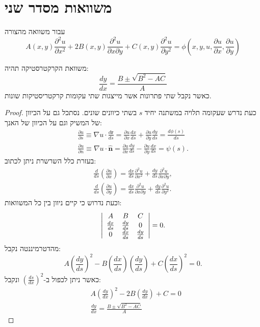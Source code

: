 \documentclass{tstextbook}
\begin{document}
\section{משוואות מסדר שני}

\begin{definition}
עבור משוואה מהצורה 
$$ A(x,y)\frac{\partial^2u}{\partial x^2}\!+\!2B(x,y)\frac{\partial^2u}{\partial x\partial y}\!+\!C(x,y)\frac{\partial^2u}{\partial y^2}\!=\!\phi\left(\!x,\!y,\!u,\!\!\frac{\partial u}{\partial x},\!\!\frac{\partial u}{\partial y}\right)$$

\end{definition}
\begin{proposition}
משוואת הקרקטרסטיקה תהיה:
$$\frac{dy}{dx}=\frac{B\pm\sqrt{B^2-AC}}{A}$$
כאשר נקבל שתי פתרונות אשר מייצגות שתי עקומות קרקטריסטיקות שונות.

\end{proposition}
\begin{proof}
כעת נדרש שעקומה תלויה במשתנה יחיד \(s\) בשתי כיוונים שונים. נסתכל גם על הכיוון של המשיק וגם על הכיוון של האנך:
$$\begin{array}{l}{{{\frac{\partial u}{\partial s}}\equiv\nabla u\cdot{\frac{d\mathbf{r}}{d s}}={\frac{\partial u}{\partial x}}{\frac{d x}{d s}}+{\frac{\partial u}{\partial y}}{\frac{d y}{d s}}={\frac{d\phi(s)}{d s}}}}\\ {{{\frac{\partial u}{\partial n}}\equiv\nabla u\cdot{\hat{\mathbf{n}}}={\frac{\partial u}{\partial x}}{\frac{d y}{d s}}-{\frac{\partial u}{\partial y}}{\frac{d x}{d s}}=\psi(s).}}\end{array}$$
בעזרת כלל השרשרת ניתן לכתוב:
$$\begin{array}{l}{{\frac{d}{d s}\left(\frac{\partial u}{\partial x}\right)=\frac{d x}{d s}\frac{\partial^{2}u}{\partial x^{2}}+\frac{d y}{d s}\frac{\partial^{2}u}{\partial x\partial y},}}\\ {{\frac{d}{d s}\left(\frac{\partial u}{\partial y}\right)=\frac{d x}{d s}\frac{\partial^{2}u}{\partial x\partial y}+\frac{d y}{d s}\frac{\partial^{2}u}{\partial y^{2}}.}}\end{array}$$
וכעת נדרוש כי קיים ניוון בין כל המשוואות:
$$\left|\begin{array}{c c c}{{A}}&{{B}}&{{C}}\\ {{\frac{d x}{d s}}}&{{\frac{d y}{d s}}}&{{0}}\\ {{0}}&{{\frac{d x}{d s}}}&{{\frac{d y}{d s}}}\end{array}\right|=0.$$
מהדטרמיננטה נקבל:
$$A\left({\frac{d y}{d s}}\right)^{2}-B\left({\frac{d x}{d s}}\right)\left({\frac{d y}{d s}}\right)+C\left({\frac{d x}{d s}}\right)^{2}=0.$$
כאשר ניתן לכפול ב-\(\left( \frac{ds}{dx} \right)^2\) ונקבל:
$$ \begin{aligned}&A\left(\frac{dy}{dx}\right)^2-2B\left(\frac{dy}{dx}\right)+C=0\\&\frac{dy}{dx}=\frac{B\pm\sqrt{B^2-AC}}{A}\end{aligned}$$

\end{proof}
\end{document}
